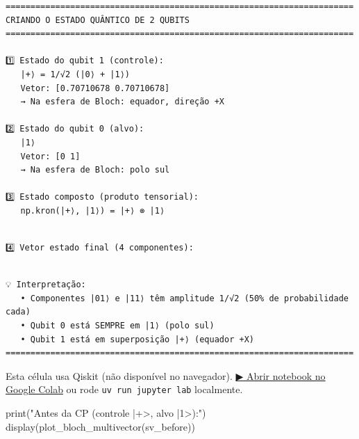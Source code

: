 \documentclass[
  brazilian,
]{report}
\newenvironment{Shaded}{\begin{snugshade}}{\end{snugshade}}
\newcommand{\BuiltInTok}[1]{\textcolor[rgb]{0.00,0.23,0.31}{#1}}
\newcommand{\NormalTok}[1]{\textcolor[rgb]{0.00,0.23,0.31}{#1}}
\newcommand{\StringTok}[1]{\textcolor[rgb]{0.13,0.47,0.30}{#1}}
\begin{document}
\begin{verbatim}
======================================================================
CRIANDO O ESTADO QUÂNTICO DE 2 QUBITS
======================================================================

1️⃣ Estado do qubit 1 (controle):
   |+⟩ = 1/√2 (|0⟩ + |1⟩)
   Vetor: [0.70710678 0.70710678]
   → Na esfera de Bloch: equador, direção +X

2️⃣ Estado do qubit 0 (alvo):
   |1⟩
   Vetor: [0 1]
   → Na esfera de Bloch: polo sul

3️⃣ Estado composto (produto tensorial):
   np.kron(|+⟩, |1⟩) = |+⟩ ⊗ |1⟩
\end{verbatim}

\begin{verbatim}

4️⃣ Vetor estado final (4 componentes):
\end{verbatim}

\begin{verbatim}

💡 Interpretação:
   • Componentes |01⟩ e |11⟩ têm amplitude 1/√2 (50% de probabilidade cada)
   • Qubit 0 está SEMPRE em |1⟩ (polo sul)
   • Qubit 1 está em superposição |+⟩ (equador +X)
======================================================================
\end{verbatim}

\begin{tcolorbox}[enhanced jigsaw, arc=.35mm, bottomrule=.15mm, bottomtitle=1mm, breakable, colback=white, colbacktitle=quarto-callout-warning-color!10!white, colframe=quarto-callout-warning-color-frame, coltitle=black, left=2mm, leftrule=.75mm, opacityback=0, opacitybacktitle=0.6, rightrule=.15mm, title=\textcolor{quarto-callout-warning-color}{\faExclamationTriangle}\hspace{0.5em}{⚛️ Célula Qiskit --- execute no Colab ou localmente}, titlerule=0mm, toprule=.15mm, toptitle=1mm]

Esta célula usa Qiskit (não disponível no navegador).
\href{https://colab.research.google.com/github/maxwellamaral/aula-quantum/blob/main/notebooks/00b-phases.ipynb}{▶
Abrir notebook no Google Colab} ou rode \texttt{uv\ run\ jupyter\ lab}
localmente.

\begin{Shaded}
\begin{Highlighting}[]


\BuiltInTok{print}\NormalTok{(}\StringTok{"Antes da CP (controle |+\textgreater{}, alvo |1\textgreater{}):"}\NormalTok{)}
\NormalTok{display(plot\_bloch\_multivector(sv\_before))}
\end{Highlighting}
\end{Shaded}

\end{tcolorbox}
\end{document}
